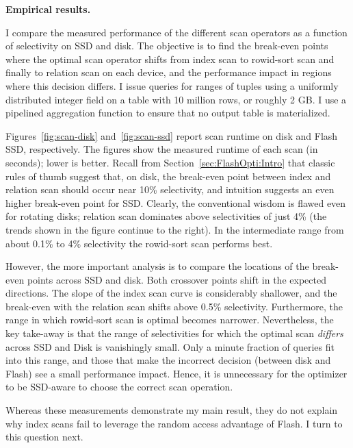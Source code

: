 \textbf{Empirical results.}

I compare the measured performance of the different scan operators as a function of selectivity on SSD and disk.
The objective is to find the break-even points where the optimal scan operator shifts from index scan to rowid-sort scan and finally to relation scan on each device, and the performance impact in regions where this decision differs.
I issue queries for ranges of tuples using a uniformly distributed integer field on a table with 10 million rows, or roughly 2 GB. 
I use a pipelined aggregation function to ensure that no output table is materialized.

Figures~\ref{fig:scan-disk} and~\ref{fig:scan-ssd} report scan runtime on disk and Flash SSD, respectively.
The figures show the measured runtime of each scan (in seconds); lower is better. 
Recall from Section~\ref{sec:FlashOpti:Intro} that classic rules of thumb suggest that, on disk, the break-even point between index and relation scan should occur near 10\% selectivity, and intuition suggests an even higher break-even point for SSD.
Clearly, the conventional wisdom is flawed even for rotating disks; relation scan dominates above selectivities of just 4\% (the trends shown in the figure continue to the right).  
In the intermediate range from about 0.1\% to 4\% selectivity the rowid-sort scan performs best.

However, the more important analysis is to compare the locations of the break-even points across SSD and disk.  
Both crossover points shift in the expected directions.
The slope of the index scan curve is considerably shallower, and the break-even with the relation scan shifts above 0.5\% selectivity.  
Furthermore, the range in which rowid-sort scan is optimal becomes narrower.
Nevertheless, the key take-away is that the range of selectivities for which the optimal scan \emph{differs} across SSD and Disk is vanishingly small.
Only a minute fraction of queries fit into this range, and those that make the incorrect decision (between disk and Flash) see a small performance impact.
Hence, it is unnecessary for the optimizer to be SSD-aware to choose the correct scan operation.

Whereas these measurements demonstrate my main result, they do not explain why index scans fail to leverage the random access advantage of Flash.  
I turn to this question next. 

